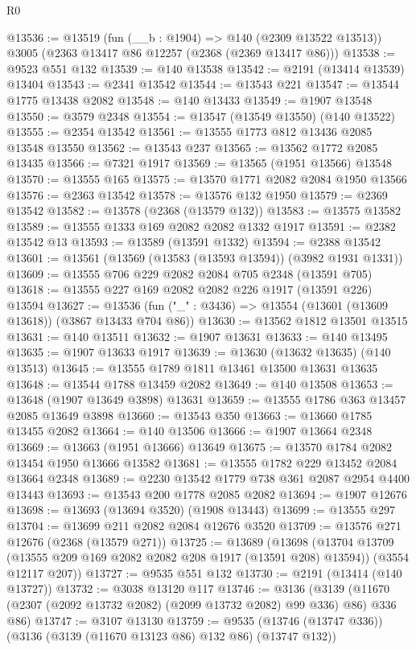 \begin{lexlean}{R0}
\begin{coremodule}
@13536 := @13519
    (fun (__b : @1904) => @140 (@2309 @13522 @13513))
    @3005
    (@2363 @13417 @86 @12257 (@2368 (@2369 @13417 @86)))
@13538 := @9523 @551 @132
@13539 := @140 @13538
@13542 := @2191 (@13414 @13539) @13404
@13543 := @2341 @13542
@13544 := @13543 @221
@13547 := @13544 @1775 @13438 @2082
@13548 := @140 @13433
@13549 := @1907 @13548
@13550 := @3579 @2348
@13554 := @13547 (@13549 @13550) (@140 @13522)
@13555 := @2354 @13542
@13561 := @13555 @1773 @812 @13436 @2085 @13548 @13550
@13562 := @13543 @237
@13565 := @13562 @1772 @2085 @13435
@13566 := @7321 @1917
@13569 := @13565 (@1951 @13566) @13548
@13570 := @13555 @165
@13575 := @13570 @1771 @2082 @2084 @1950 @13566
@13576 := @2363 @13542
@13578 := @13576 @132 @1950
@13579 := @2369 @13542
@13582 := @13578 (@2368 (@13579 @132))
@13583 := @13575 @13582
@13589 := @13555 @1333 @169 @2082 @2082 @1332 @1917
@13591 := @2382 @13542 @13
@13593 := @13589 (@13591 @1332)
@13594 := @2388 @13542
@13601 := @13561 (@13569 (@13583 (@13593 @13594)) (@3982 @1931 @1331))
@13609 := @13555 @706 @229 @2082 @2084 @705 @2348 (@13591 @705)
@13618 := @13555 @227 @169 @2082 @2082 @226 @1917 (@13591 @226) @13594
@13627 := @13536 (fun ("_" : @3436) => @13554 (@13601 (@13609 @13618)) (@3867 @13433 @704 @86))
@13630 := @13562 @1812 @13501 @13515
@13631 := @140 @13511
@13632 := @1907 @13631
@13633 := @140 @13495
@13635 := @1907 @13633 @1917
@13639 := @13630 (@13632 @13635) (@140 @13513)
@13645 := @13555 @1789 @1811 @13461 @13500 @13631 @13635
@13648 := @13544 @1788 @13459 @2082
@13649 := @140 @13508
@13653 := @13648 (@1907 @13649 @3898) @13631
@13659 := @13555 @1786 @363 @13457 @2085 @13649 @3898
@13660 := @13543 @350
@13663 := @13660 @1785 @13455 @2082
@13664 := @140 @13506
@13666 := @1907 @13664 @2348
@13669 := @13663 (@1951 @13666) @13649
@13675 := @13570 @1784 @2082 @13454 @1950 @13666 @13582
@13681 := @13555 @1782 @229 @13452 @2084 @13664 @2348
@13689 := @2230 @13542 @1779 @738 @361 @2087 @2954 @4400 @13443
@13693 := @13543 @200 @1778 @2085 @2082
@13694 := @1907 @12676
@13698 := @13693 (@13694 @3520) (@1908 @13443)
@13699 := @13555 @297
@13704 := @13699 @211 @2082 @2084 @12676 @3520
@13709 := @13576 @271 @12676 (@2368 (@13579 @271))
@13725 := @13689
    (@13698
      (@13704 @13709 (@13555 @209 @169 @2082 @2082 @208 @1917 (@13591 @208) @13594))
      (@3554 @12117 @207))
@13727 := @9535 @551 @132
@13730 := @2191 (@13414 (@140 @13727))
@13732 := @3038 @13120 @117
@13746 := @3136
    (@3139 (@11670 (@2307 (@2092 @13732 @2082) (@2099 @13732 @2082) @99 @336) @86) @336 @86)
@13747 := @3107 @13130
@13759 := @9535 (@13746 (@13747 @336)) (@3136 (@3139 (@11670 @13123 @86) @132 @86) (@13747 @132))

\end{coremodule}
\end{lexlean}
